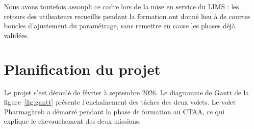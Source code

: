 Nous avons toutefois assoupli ce cadre lors de la mise en service du \ac{LIMS} : les retours des utilisateurs recueillis pendant la formation ont donné lieu à de courtes boucles d'ajustement du paramétrage, sans remettre en cause les phases déjà validées.

\section{Planification du projet}

Le projet s'est déroulé de février à septembre 2026. Le diagramme de Gantt de la figure~\ref{fig:gantt} présente l'enchaînement des tâches des deux volets. Le volet Pharmaghreb a démarré pendant la phase de formation au \ac{CTAA}, ce qui explique le chevauchement des deux missions.

